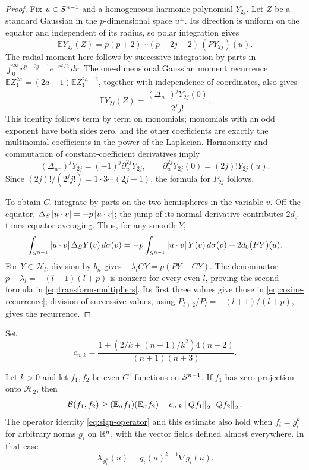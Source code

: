\begin{proof}
Fix $u\in S^{n-1}$ and a homogeneous harmonic polynomial $Y_{2j}$.
Let $Z$ be a standard Gaussian in the $p$-dimensional space $u^\perp$.
Its direction is uniform on the equator and independent of its radius,
so polar integration gives
\[
 \mathbb E Y_{2j}(Z)
 =p(p+2)\cdots(p+2j-2)\,(PY_{2j})(u).
\]
The radial moment here follows by successive integration by parts in
$\int_0^\infty r^{p+2j-1}e^{-r^2/2}\,dr$.
The one-dimensional Gaussian moment recurrence
$\mathbb E Z_1^{2a}=(2a-1)\mathbb E Z_1^{2a-2}$, together with
independence of coordinates, also gives
\[
 \mathbb E Y_{2j}(Z)
 =\frac{(\Delta_{u^\perp})^jY_{2j}(0)}{2^j j!}.
\]
This identity follows term by term on monomials; monomials with an odd
exponent have both sides zero, and the other coefficients are exactly
the multinomial coefficients in the power of the Laplacian.
Harmonicity and commutation of constant-coefficient derivatives imply
\[
 (\Delta_{u^\perp})^jY_{2j}
   =(-1)^j\partial_u^{2j}Y_{2j},
 \qquad
 \partial_u^{2j}Y_{2j}(0)=(2j)!Y_{2j}(u).
\]
Since $(2j)!/(2^j j!)=1\cdot3\cdots(2j-1)$, the formula for $P_{2j}$
follows.

To obtain $C$, integrate by parts on the two hemispheres in the
variable $v$.  Off the equator,
$\Delta_S\left|u\cdot v\right|=-p\left|u\cdot v\right|$; the jump of its normal
derivative contributes $2d_0$ times equator averaging.  Thus, for any
smooth $Y$,
\[
 \int_{S^{n-1}}\left|u\cdot v\right|\Delta_S Y(v)\,d\sigma(v)
 =-p\int_{S^{n-1}}\left|u\cdot v\right|Y(v)\,d\sigma(v)
   +2d_0(PY)(u).
\]
For $Y\in\mathcal H_l$, division by $b_n$ gives
$-\lambda_l CY=p(PY-CY)$.  The denominator
$p-\lambda_l=-(l-1)(l+p)$ is nonzero for every even $l$, proving the
second formula in \eqref{eq:transform-multipliers}.  Its first three
values give those in \eqref{eq:cosine-recurrence}; division of successive
values, using $P_{l+2}/P_l=-(l+1)/(l+p)$, gives the recurrence.
\end{proof}

Set
\begin{equation}\label{eq:tail-constant}
 c_{n,k}=
 \frac{1+\left(2/k+(n-1)/k^2\right)4(n+2)}{(n+1)(n+3)}.
\end{equation}

\begin{proposition}\label{prop:sign-estimate}
Let $k>0$ and let $f_1,f_2$ be even $C^1$ functions on $S^{n-1}$.
If $f_1$ has zero projection onto $\mathcal H_2$, then
\begin{equation}\label{eq:sign-bound}
 \mathcal B(f_1,f_2)
 \ge (\mathbb E_{\sigma} f_1)(\mathbb E_{\sigma} f_2)
       -c_{n,k}\left\lVert Qf_1\right\rVert_2\left\lVert Qf_2\right\rVert_2.
\end{equation}
The operator identity \eqref{eq:sign-operator} and this estimate also
hold when $f_i=g_i^k$ for arbitrary norms $g_i$ on $\mathbb R^n$, with the
vector fields defined almost everywhere.  In that case
\begin{equation}\label{eq:norm-vector-field}
 X_{g_i^k}(u)=g_i(u)^{k-1}\nabla g_i(u).
\end{equation}
\end{proposition}

